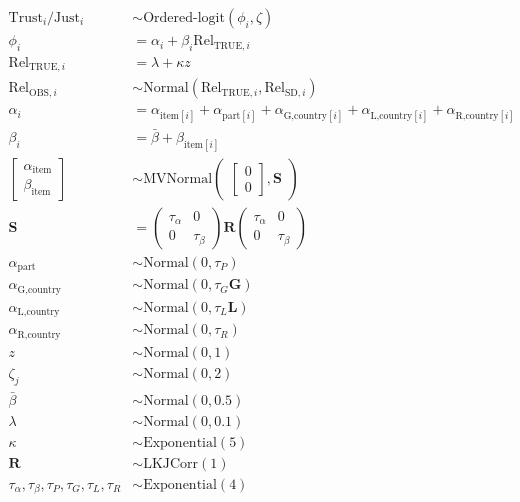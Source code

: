 \documentclass[
  man,floatsintext]{apa6}
\begin{document}
\[
\begin{aligned}
\text{Trust}_{i}/\text{Just}_{i} &\sim \text{Ordered-logit}(\phi_{i},\zeta) \\
\phi_{i} &= \alpha_{i} + \beta_{i}\text{Rel}_{\text{TRUE},i} \\
\text{Rel}_{\text{TRUE},i} &= \lambda + \kappa z \\
\text{Rel}_{\text{OBS},i} &\sim \text{Normal}(\text{Rel}_{\text{TRUE},i}, \text{Rel}_{\text{SD},i}) \\
\alpha_{i} &= \alpha_{\text{item}[i]} + \alpha_{\text{part}[i]} + \alpha_{\text{G,country}[i]} + \alpha_{\text{L,country}[i]} + \alpha_{\text{R,country}[i]} \\
\beta_{i} &= \bar{\beta} + \beta_{\text{item}[i]} \\
\begin{bmatrix}\alpha_{\text{item}}\\
\beta_{\text{item}}\end{bmatrix} &\sim \text{MVNormal}
\begin{pmatrix}\begin{bmatrix}0\\0\end{bmatrix}, \textbf{S}
\end{pmatrix}\\
\textbf{S} &=
\begin{pmatrix}\tau_{\alpha}&0\\0&\tau_{\beta}\end{pmatrix}
\textbf{R}
\begin{pmatrix}\tau_{\alpha}&0\\0&\tau_{\beta}\end{pmatrix} \\
\alpha_{\text{part}} &\sim \text{Normal}(0, \tau_{P}) \\
\alpha_{\text{G,country}} &\sim \text{Normal}(0, \tau_{G} \textbf{G}) \\
\alpha_{\text{L,country}} &\sim \text{Normal}(0, \tau_{L} \textbf{L}) \\
\alpha_{\text{R,country}} &\sim \text{Normal}(0, \tau_{R}) \\
z &\sim \text{Normal}(0, 1)\\
\zeta_{j} &\sim \text{Normal}(0, 2)\\
\bar{\beta} &\sim \text{Normal}(0, 0.5) \\
\lambda &\sim \text{Normal}(0, 0.1) \\
\kappa &\sim \text{Exponential}(5) \\
\textbf{R} &\sim \text{LKJCorr}(1)\\
\tau_{\alpha},\tau_{\beta},\tau_{P},\tau_{G},\tau_{L},\tau_{R} &\sim \text{Exponential}(4) \\
\end{aligned}
\]
\end{document}
